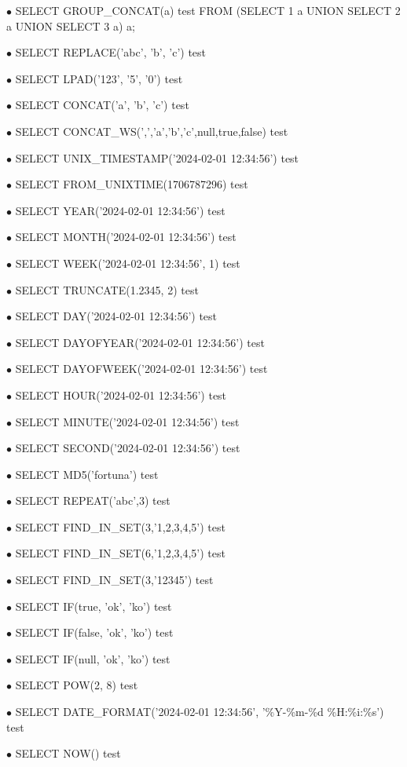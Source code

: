 \documentclass[a4paper]{book}
\begin{document}
\begin{compactitem}
\item[\color{myblue}$\bullet$] SELECT GROUP\_CONCAT(a) test FROM (SELECT 1 a UNION SELECT 2 a UNION SELECT 3 a) a;
\item[\color{myblue}$\bullet$] SELECT REPLACE('abc', 'b', 'c') test
\item[\color{myblue}$\bullet$] SELECT LPAD('123', '5', '0') test
\item[\color{myblue}$\bullet$] SELECT CONCAT('a', 'b', 'c') test
\item[\color{myblue}$\bullet$] SELECT CONCAT\_WS(',','a','b','c',null,true,false) test
\item[\color{myblue}$\bullet$] SELECT UNIX\_TIMESTAMP('2024-02-01 12:34:56') test
\item[\color{myblue}$\bullet$] SELECT FROM\_UNIXTIME(1706787296) test
\item[\color{myblue}$\bullet$] SELECT YEAR('2024-02-01 12:34:56') test
\item[\color{myblue}$\bullet$] SELECT MONTH('2024-02-01 12:34:56') test
\item[\color{myblue}$\bullet$] SELECT WEEK('2024-02-01 12:34:56', 1) test
\item[\color{myblue}$\bullet$] SELECT TRUNCATE(1.2345, 2) test
\item[\color{myblue}$\bullet$] SELECT DAY('2024-02-01 12:34:56') test
\item[\color{myblue}$\bullet$] SELECT DAYOFYEAR('2024-02-01 12:34:56') test
\item[\color{myblue}$\bullet$] SELECT DAYOFWEEK('2024-02-01 12:34:56') test
\item[\color{myblue}$\bullet$] SELECT HOUR('2024-02-01 12:34:56') test
\item[\color{myblue}$\bullet$] SELECT MINUTE('2024-02-01 12:34:56') test
\item[\color{myblue}$\bullet$] SELECT SECOND('2024-02-01 12:34:56') test
\item[\color{myblue}$\bullet$] SELECT MD5('fortuna') test
\item[\color{myblue}$\bullet$] SELECT REPEAT('abc',3) test
\item[\color{myblue}$\bullet$] SELECT FIND\_IN\_SET(3,'1,2,3,4,5') test
\item[\color{myblue}$\bullet$] SELECT FIND\_IN\_SET(6,'1,2,3,4,5') test
\item[\color{myblue}$\bullet$] SELECT FIND\_IN\_SET(3,'12345') test
\item[\color{myblue}$\bullet$] SELECT IF(true, 'ok', 'ko') test
\item[\color{myblue}$\bullet$] SELECT IF(false, 'ok', 'ko') test
\item[\color{myblue}$\bullet$] SELECT IF(null, 'ok', 'ko') test
\item[\color{myblue}$\bullet$] SELECT POW(2, 8) test
\item[\color{myblue}$\bullet$] SELECT DATE\_FORMAT('2024-02-01 12:34:56', '\%Y-\%m-\%d \%H:\%i:\%s') test
\item[\color{myblue}$\bullet$] SELECT NOW() test
\end{compactitem}
\end{document}
